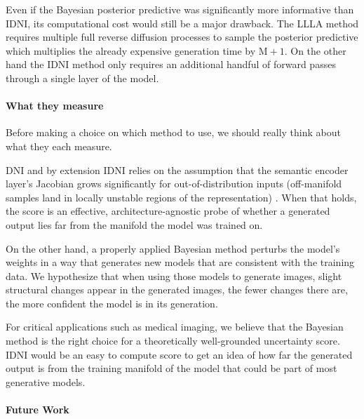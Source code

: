 
Even if the Bayesian posterior predictive was significantly more informative than \acs{IDNI}, its computational cost would still be a major drawback. The \acs{LLLA} method requires multiple full reverse diffusion processes to sample the posterior predictive which multiplies the already expensive generation time by $\mathrm{M+1}$. On the other hand the \acs{IDNI} method only requires an additional handful of forward passes through a single layer of the model.

\paragraph{What they measure}
Before making a choice on which method to use, we should really think about what they each measure.

\acs{DNI} and by extension \acs{IDNI} relies on the assumption that the semantic encoder layer's Jacobian grows significantly for out-of-distribution inputs (off-manifold samples land in locally unstable regions of the representation) \parencite{novak_sensitivity_2018}. When that holds, the score is an effective, architecture-agnostic probe of whether a generated output lies far from the manifold the model was trained on.

On the other hand, a properly applied Bayesian method perturbs the model's weights in a way that generates new models that are consistent with the training data. We hypothesize that when using those models to generate images, slight structural changes appear in the generated images, the fewer changes there are, the more confident the model is in its generation.

For critical applications such as medical imaging, we believe that the Bayesian method is the right choice for a theoretically well-grounded uncertainty score. \acs{IDNI} would be an easy to compute score to get an idea of how far the generated output is from the training manifold of the model that could be part of most generative models.

\paragraph{Future Work}

